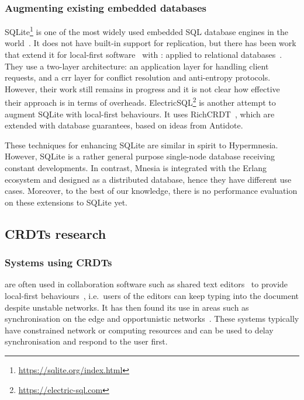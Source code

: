 \subsubsection{Augmenting existing embedded databases}

SQLite\footnote{\url{https://sqlite.org/index.html}} is one of the most widely 
used embedded SQL database engines in the world~\cite{hipp2019sqlite}. 
It does not have built-in support for replication, but there has been work that 
extend it for local-first software~\cite{tomter2021SQLitelocal} with
:  applied to relational databases~\cite{yu2020CausalLen}.
They use a two-layer architecture: an application layer for handling client requests,
and a \acrshort{crr} layer for conflict resolution and anti-entropy protocols.
However, their work still remains in progress and it is not clear how effective their
approach is in terms of overheads. ElectricSQL\footnote{\url{https://electric-sql.com}} 
is another attempt to augment SQLite with local-first behaviours. 
It uses RichCRDT~\cite{balegas2022richcrdt}, which are 
extended with database guarantees, based on ideas from Antidote.

These techniques for enhancing SQLite are similar in spirit to Hypermnesia. However,
SQLite is a rather general purpose single-node database receiving constant developments.
In contrast, Mnesia is integrated with the Erlang ecosystem and designed as a 
distributed database, hence they have different use cases.
Moreover, to the best of our knowledge, there is no performance evaluation on 
these extensions to SQLite yet.

\subsection{CRDTs research} \label{sec:related crdt}

\subsubsection{Systems using CRDTs} \label{subsec:related crdt system}

 are often used in collaboration software such
as shared text editors~\cite{weiss2010Logoot} to provide local-first 
behaviours~\cite{kleppmann2019local-first}, i.e.\ users
of the editors can keep typing into the document despite unstable networks.
It has then found its use in areas such as synchronisation on the edge and
opportunistic networks~\cite{guidec2023opportunistic,yu2020crr}. 
These systems typically have constrained network or computing resources and 
 can be used to delay synchronisation and respond to the user first. 


